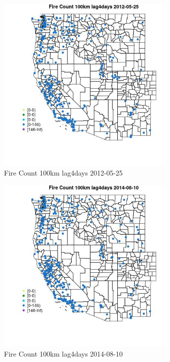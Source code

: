 \begin{figure} 
\centering  
\includegraphics[width=0.77\textwidth]{Code_Outputs/Report_ML_input_PM25_Step4_part_e_de_duplicated_aves_compiled_2019-05-18wNAs_MapObsFire_Count_100km_lag4days2012-05-25.jpg} 
\caption{\label{fig:Report_ML_input_PM25_Step4_part_e_de_duplicated_aves_compiled_2019-05-18wNAsMapObsFire_Count_100km_lag4days2012-05-25}Fire Count 100km lag4days 2012-05-25} 
\end{figure} 
 

\begin{figure} 
\centering  
\includegraphics[width=0.77\textwidth]{Code_Outputs/Report_ML_input_PM25_Step4_part_e_de_duplicated_aves_compiled_2019-05-18wNAs_MapObsFire_Count_100km_lag4days2014-08-10.jpg} 
\caption{\label{fig:Report_ML_input_PM25_Step4_part_e_de_duplicated_aves_compiled_2019-05-18wNAsMapObsFire_Count_100km_lag4days2014-08-10}Fire Count 100km lag4days 2014-08-10} 
\end{figure} 
 

